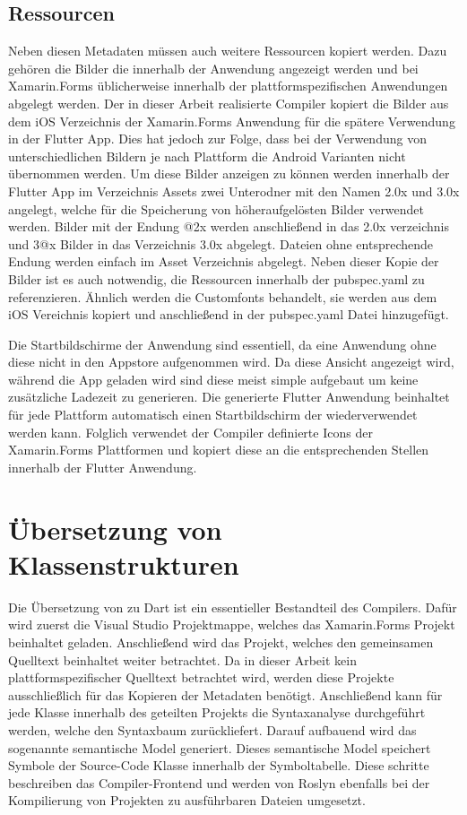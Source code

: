 \subsection{Ressourcen}
Neben diesen Metadaten müssen auch weitere Ressourcen kopiert werden.  Dazu gehören die Bilder die innerhalb der Anwendung angezeigt werden und bei Xamarin.Forms üblicherweise innerhalb der plattformspezifischen Anwendungen abgelegt werden.  Der in dieser Arbeit realisierte Compiler kopiert die Bilder aus dem iOS Verzeichnis der Xamarin.Forms Anwendung für die spätere Verwendung in der Flutter App.  Dies hat jedoch zur Folge, dass bei der Verwendung von unterschiedlichen Bildern je nach Plattform die Android Varianten nicht übernommen werden.  Um diese Bilder anzeigen zu können werden innerhalb der Flutter App im Verzeichnis Assets zwei Unterodner mit den Namen 2.0x und 3.0x angelegt, welche für die Speicherung von höheraufgelösten Bilder verwendet werden.  Bilder mit der Endung @2x werden anschließend in das 2.0x verzeichnis und 3@x Bilder in das Verzeichnis 3.0x abgelegt.  Dateien ohne entsprechende Endung werden einfach im Asset Verzeichnis abgelegt.  Neben dieser Kopie der Bilder ist es auch notwendig,  die Ressourcen innerhalb der pubspec.yaml zu referenzieren. Ähnlich werden die Customfonts behandelt,  sie werden aus dem iOS Vereichnis kopiert und anschließend in der pubspec.yaml Datei hinzugefügt.  


Die Startbildschirme der Anwendung sind essentiell,  da eine Anwendung ohne diese nicht in den Appstore aufgenommen wird.  Da diese Ansicht angezeigt wird,  während die App geladen wird sind diese meist simple aufgebaut um keine zusätzliche Ladezeit zu generieren.  Die generierte Flutter Anwendung beinhaltet für jede Plattform automatisch einen Startbildschirm der wiederverwendet werden kann.  Folglich verwendet der Compiler definierte Icons der Xamarin.Forms Plattformen und kopiert diese an die entsprechenden Stellen innerhalb der Flutter Anwendung.  



\section{Übersetzung von Klassenstrukturen}

Die Übersetzung von \Csharp zu Dart ist ein essentieller Bestandteil des Compilers.  Dafür wird zuerst die Visual Studio Projektmappe,  welches das Xamarin.Forms Projekt beinhaltet geladen.  Anschließend wird das Projekt, welches den gemeinsamen Quelltext beinhaltet weiter betrachtet. Da in dieser Arbeit kein plattformspezifischer Quelltext betrachtet wird,  werden diese Projekte ausschließlich für das Kopieren der Metadaten benötigt.  Anschließend kann für jede Klasse innerhalb des geteilten Projekts die Syntaxanalyse durchgeführt werden, welche den Syntaxbaum zurückliefert.  Darauf aufbauend wird das sogenannte semantische Model generiert.  Dieses semantische Model speichert Symbole der Source-Code Klasse innerhalb der Symboltabelle.  Diese schritte beschreiben das Compiler-Frontend und werden von Roslyn ebenfalls bei der Kompilierung von Projekten zu ausführbaren Dateien umgesetzt.  


